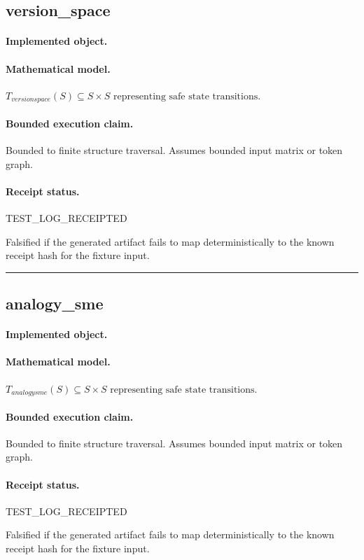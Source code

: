 \subsection{version\_space}
\paragraph{Implemented object.} 
\paragraph{Mathematical model.} $T_{versionspace}(S) \subseteq S \times S \text{ representing safe state transitions}.$
\paragraph{Bounded execution claim.} Bounded to finite structure traversal. Assumes bounded input matrix or token graph.
\paragraph{Receipt status.} TEST\_LOG\_RECEIPTED
\begin{falsifier}
Falsified if the generated artifact fails to map deterministically to the known receipt hash for the fixture input.
\end{falsifier}

\vspace{1em}\hrule\vspace{1em}
\subsection{analogy\_sme}
\paragraph{Implemented object.} 
\paragraph{Mathematical model.} $T_{analogysme}(S) \subseteq S \times S \text{ representing safe state transitions}.$
\paragraph{Bounded execution claim.} Bounded to finite structure traversal. Assumes bounded input matrix or token graph.
\paragraph{Receipt status.} TEST\_LOG\_RECEIPTED
\begin{falsifier}
Falsified if the generated artifact fails to map deterministically to the known receipt hash for the fixture input.
\end{falsifier}


